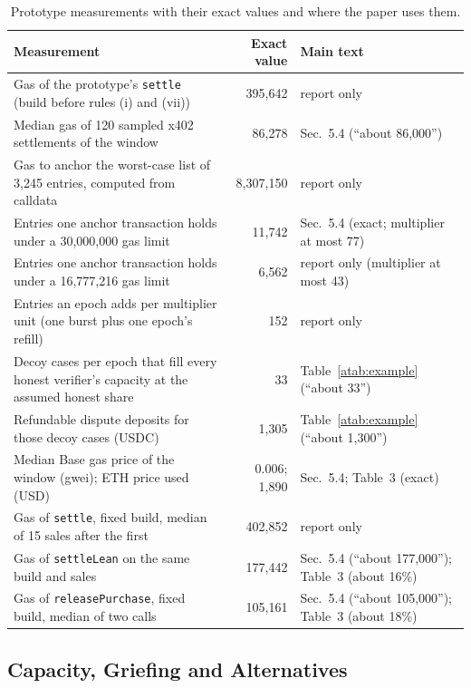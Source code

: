 \documentclass[10pt,a4paper]{article}
\theoremstyle{plain}
\theoremstyle{remark}
\begin{document}
\begin{table}[!htbp]
\centering
\caption{Prototype measurements with their exact values and where the paper uses them.}
\label{tab:proto}
\small
\setlength{\tabcolsep}{4pt}
\begin{tabular}{@{}>{\raggedright}p{8.2cm}r>{\raggedright\arraybackslash}p{5.2cm}@{}}
\toprule
Measurement & Exact value & Main text \\
\midrule
Gas of the prototype's \texttt{settle} (build before rules (i) and (vii)) & 395,642 & report only \\
Median gas of 120 sampled x402 settlements of the window & 86,278 & Sec.~5.4 (``about 86,000'') \\
Gas to anchor the worst-case list of 3,245 entries, computed from calldata & 8,307,150 & report only \\
Entries one anchor transaction holds under a 30,000,000 gas limit & 11,742 & Sec.~5.4 (exact; multiplier at most 77) \\
Entries one anchor transaction holds under a 16,777,216 gas limit & 6,562 & report only (multiplier at most 43) \\
Entries an epoch adds per multiplier unit (one burst plus one epoch's refill) & 152 & report only \\
Decoy cases per epoch that fill every honest verifier's capacity at the assumed honest share & 33 & Table~\ref{atab:example} (``about 33'') \\
Refundable dispute deposits for those decoy cases (USDC) & 1,305 & Table~\ref{atab:example} (``about 1,300'') \\
Median Base gas price of the window (gwei); ETH price used (USD) & 0.006; 1,890 & Sec.~5.4; Table~3 (exact) \\
Gas of \texttt{settle}, fixed build, median of 15 sales after the first & 402,852 & report only \\
Gas of \texttt{settleLean} on the same build and sales & 177,442 & Sec.~5.4 (``about 177,000''); Table~3 (about 16\%) \\
Gas of \texttt{releasePurchase}, fixed build, median of two calls & 105,161 & Sec.~5.4 (``about 105,000''); Table~3 (about 18\%) \\
\bottomrule
\end{tabular}
\end{table}

\subsection{Capacity, Griefing and Alternatives}
\label{sec:alternatives}
\end{document}
